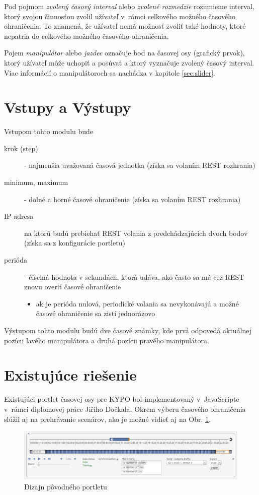 \documentclass[
  digital, %
  twoside, %
  notable,   %
  nolof,   %
  nolot,   %
]{fithesis3}
\begin{document}
Pod pojmom \textit{zvolený časový interval} alebo \textit{zvolené rozmedzie} ro\-zu\-mie\-me interval, ktorý svojou činnosťou zvolil užívateľ v~rámci celkového možného časového ohraničenia. To znamená, že užívateľ nemá možnosť zvoliť také hodnoty, ktoré nepatria do celkového možného časového ohraničenia.

Pojem \textit{manipulátor} alebo \textit{jazdec} označuje bod na časovej osy (grafický prvok), ktorý užívateľ môže uchopiť a posúvať a ktorý vyznačuje zvolený časový interval. Viac informácií o manipulátoroch sa nachádza v kapitole \ref{sec:slider}.

\section{Vstupy a Výstupy}
Vstupom tohto modulu bude
\begin{description}
\item[krok (step)] - najmenšia uvažovaná časová jednotka (získa sa volaním REST rozhrania)
\item[minimum, maximum] - dolné a horné časové ohraničenie (získa sa volaním REST rozhrania)
\item[IP adresa] na ktorú budú prebiehať REST volania z predchádzajúcich dvoch bodov (získa sa z konfigurácie portletu)
\item[perióda] - číselná hodnota v sekundách, ktorá udáva, ako často sa má cez REST znovu overiť časové ohraničenie
\begin{itemize}
\item ak je perióda nulová, periodické volania sa nevykonávajú a možné časové ohraničenie sa zistí jednorázovo
\end{itemize}
\end{description}
Výstupom tohto modulu budú dve časové známky, kde prvá odpovedá aktuálnej pozícii ľavého manipulátora a druhá pozícii pravého manipulátora.

\section{Existujúce riešenie}
Existujúci portlet časovej osy pre KYPO bol implementovaný v~JavaScripte v~rámci diplomovej práce Jiřího Dočkala\cite{dockal2016webovy}. Okrem výberu časového ohraničenia slúžil aj na prehrávanie scenárov, ako je možné vidieť aj na Obr. \ref{old_portlet}.

\begin{figure}[H]
	\center
	\includegraphics[width=1.0\linewidth]{old_portlet}
	\caption{Dizajn pôvodného portletu\cite{dockal2016webovy}}
	\label{old_portlet}
\end{figure}
\end{document}
